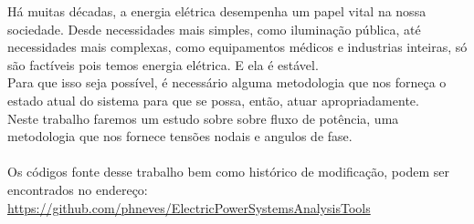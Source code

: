 \documentclass[Portugues,Final]{tese-FT}
\begin{document}
\paginasiniciais
\begin{resumo}

H\'a muitas d\'ecadas, a energia el\'etrica desempenha um papel vital na nossa sociedade. Desde necessidades mais simples, como ilumina\c{c}\~ao p\'ublica, at\'e necessidades mais complexas, como equipamentos m\'edicos e industrias inteiras, s\'o s\~ao fact\'iveis pois temos energia el\'etrica. E ela \'e est\'avel.\\
Para que isso seja poss\'ivel, \'e necess\'ario alguma metodologia que nos forne\c{c}a o estado atual do sistema para que se possa, ent\~ao, atuar apropriadamente.\\
Neste trabalho faremos um estudo sobre sobre fluxo de potência, uma metodologia que nos fornece tens\~oes nodais e angulos de fase.\\\\
Os códigos fonte desse trabalho bem como histórico de modificação, podem ser encontrados no endereço: \href{https://github.com/phneves/ElectricPowerSystemsAnalysisTools}{https://github.com/phneves/ElectricPowerSystemsAnalysisTools}



\end{resumo}


%

\renewcommand{\nomname}{Lista de Abreviações e Siglas}
\printnomenclature[3cm]


\tableofcontents
\fimdaspaginasiniciais


%
%










%

%

\begin{singlespacing}
\setlength\bibitemsep{10pt}   %
\printbibliography[heading=bibintoc, %
                   title={Referências bibliográficas} %
                  ]
\end{singlespacing}


%
\end{document}
